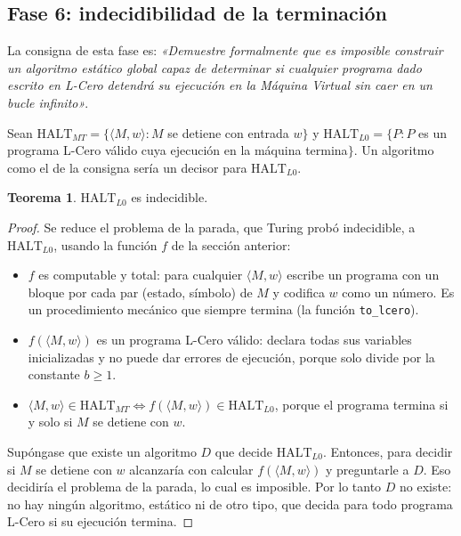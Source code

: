 \documentclass[11pt,a4paper]{article}
\theoremstyle{definition}
\newtheorem{teorema}{Teorema}
\newcommand{\tm}[1]{\texttt{#1}}
\newcommand{\HALT}{\mathrm{HALT}}
\begin{document}
\subsection{Fase 6: indecidibilidad de la terminación}
\label{sec:indecidibilidad}

La consigna de esta fase es: \emph{«Demuestre formalmente que es imposible
construir un algoritmo estático global capaz de determinar si cualquier
programa dado escrito en L-Cero detendrá su ejecución en la Máquina Virtual
sin caer en un bucle infinito»}.

Sean $\HALT_{MT} = \{\langle M, w\rangle : M$ se detiene con entrada $w\}$
y $\HALT_{L0} = \{P : P$ es un programa L-Cero válido cuya ejecución en la
máquina termina$\}$. Un algoritmo como el de la consigna sería un decisor
para $\HALT_{L0}$.

\begin{teorema}
$\HALT_{L0}$ es indecidible.
\end{teorema}

\begin{proof}
Se reduce el problema de la parada, que Turing probó indecidible, a
$\HALT_{L0}$, usando la función $f$ de la sección anterior:

\begin{itemize}
  \item $f$ es computable y total: para cualquier $\langle M, w\rangle$
  escribe un programa con un bloque por cada par (estado, símbolo) de $M$ y
  codifica $w$ como un número. Es un procedimiento mecánico que siempre
  termina (la función \tm{to\_lcero}).
  \item $f(\langle M, w\rangle)$ es un programa L-Cero válido: declara todas
  sus variables inicializadas y no puede dar errores de ejecución, porque
  solo divide por la constante $b \ge 1$.
  \item $\langle M, w\rangle \in \HALT_{MT} \iff f(\langle M, w\rangle) \in \HALT_{L0}$,
  porque el programa termina si y solo si $M$ se detiene con $w$.
\end{itemize}

Supóngase que existe un algoritmo $D$ que decide $\HALT_{L0}$. Entonces,
para decidir si $M$ se detiene con $w$ alcanzaría con calcular
$f(\langle M, w\rangle)$ y preguntarle a $D$. Eso decidiría el problema de
la parada, lo cual es imposible. Por lo tanto $D$ no existe: no hay ningún
algoritmo, estático ni de otro tipo, que decida para todo programa L-Cero si
su ejecución termina.
\end{proof}
\end{document}

